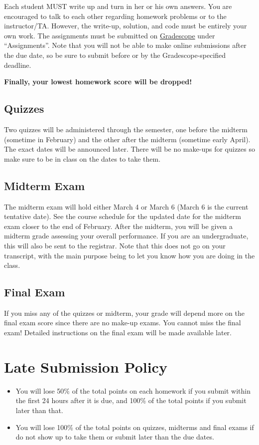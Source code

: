 \documentclass[11pt, a4paper]{article}
\begin{document}
Each student MUST write up and turn in her or his own answers. You are encouraged to talk to each other regarding homework problems or to the instructor/TA. However, the write-up, solution, and code must be entirely your own work. The assignments must be submitted on \href{https://www.gradescope.com/courses/77790/assignments}{Gradescope} under ``Assignments''. Note that you will not be able to make online submissions after the due date, so be sure to submit before or by the Gradescope-specified deadline.

\textbf{Finally, your lowest homework score will be dropped!}

\subsection{Quizzes}
Two quizzes will be administered through the semester, one before the midterm (sometime in February) and the other after the midterm (sometime early April). The exact dates will be announced later. There will be no make-ups for quizzes so make sure to be in class on the dates to take them.

\subsection{Midterm Exam}
The midterm exam will hold either March 4 or March 6 (March 6 is the current tentative date). See the course schedule for the updated date for the midterm exam closer to the end of February. After the midterm, you will be given a midterm grade assessing your overall performance. If you are an undergraduate, this will also be sent to the registrar. Note that this does not go on your transcript, with the main purpose being to let you know how you are doing in the class.

\subsection{Final Exam}
If you miss any of the quizzes or midterm, your grade will depend more on the final exam score since there are no make-up exams. You cannot miss the final exam! Detailed instructions on the final exam will be made available later.


\section{Late Submission Policy} 
\begin{itemize}
	\item  You will lose 50\% of the total points on each homework if you submit within the first 24 hours after it is due, and 100\% of the total points if you submit later than that.
	\item You will lose 100\% of the total points on quizzes, midterms and final exams if do not show up to take them or submit later than the due dates.
\end{itemize}
\end{document}
